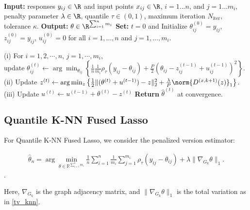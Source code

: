 \documentclass[twoside,11pt]{article}
\begin{document}
\begin{algorithm}[!htbp]
   \caption{Alternating Directions Method of Multipliers for quantile spatial temporal trend filtering in \eqref{70}}
\label{alg_tf_admm}
\begin{algorithmic}[1]
    \STATE {\bfseries } \textbf{Input:} responses \(y_{ij} \in \R\) and input points \(x_{ij} \in \R\), \(i = 1 \dots n\), and \(j = 1 \dots m_i\), penalty parameter \(\lambda \in \R\), quantile \( \tau \in (0, 1)\), maximum iteration \( N_{\text{iter}} \), tolerance \( \kappa \).
   \STATE \textbf{Output:} \( \theta \in \R^{\sum_{i=1}^n m_i} \)
   \STATE \textbf{Set:} \(t = 0\) and Initialize \( \theta_{ij}^{(0)} = y_{ij} \), \( z_{ij}^{(0)} = y_{ij} \), \( u_{ij}^{(0)} = 0 \) for all \(i = 1, \ldots, n\) and \(j = 1, \ldots, m_i\).

 \STATE (i) For $i=1,2,\cdots,n $, $j = 1, \cdots, m_i$, \\ \quad update
 \( \theta_{ij}^{(t)} \leftarrow \arg\min_{\theta_{ij}} \left\{ \frac{1}{n} \frac{1}{m_i}\rho_{\tau} (y_{ij} - \theta_{ij}) + \frac{P}{2} \left( \theta_{ij} - z_{ij}^{(t-1)} + u_{ij}^{(t-1)} \right)^2 \right\}. \)
 \STATE (ii) Update
 \( z^{(t)} \leftarrow \arg\min_{z} \left\{ \frac{1}{2} \|(\theta^{(t)} + u^{(t-1)}) - z\|_2^2 + \frac{\lambda}{P} \norm{D^{(x, k+1)}(z)}_1 \right\} \).
 \STATE (iii) Update
\( u^{(t)} \leftarrow u^{(t-1)} + \theta^{(t)} - z^{(t)} \)
\ENDFOR
\STATE \textbf{Return} $\hat \theta^{(t)}$ at convergence. 
\end{algorithmic}
\end{algorithm}

\subsection{Quantile K-NN Fused Lasso}

For Quantile K-NN Fused Lasso, we consider the penalized  version estimator:

\begin{align}
\label{80}
\hat{\theta}_n = \arg\min_{\theta \in \mathbb{R}^{\sum_{i=1}^n m_i}}\frac{1}{n} \sum_{i=1}^n \frac{1}{m_i} \sum_{j=1}^{m_i} \rho_{\tau}(y_{ij} - \theta_{ij}) + \lambda \|\nabla_{G_k} \theta\|_1. 
\end{align}. 

Here, $\nabla_{G_k}$ is the graph adjacency matrix, and $\|\nabla_{G_k} \theta\|_1$ is the total variation as in \eqref{tv_knn}. 
\end{document}
